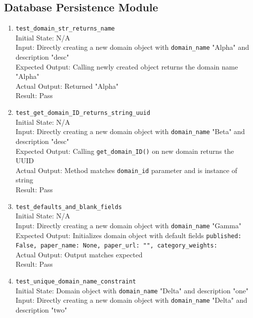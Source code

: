 \documentclass[12pt, titlepage]{article}
\begin{document}
\subsection{Database Persistence Module}
  \begin{enumerate}
    \item \texttt{test\_domain\_str\_returns\_name} \label{test-domain-str-returns-name}
      \\Initial State: N/A
      \\Input: Directly creating a new domain object with \texttt{domain\_name} "Alpha" and description "desc"
      \\Expected Output: Calling newly created object returns the domain name "Alpha"
      \\Actual Output: Returned "Alpha"
      \\Result: Pass
    \item \texttt{test\_get\_domain\_ID\_returns\_string\_uuid} \label{test-get-domain-ID-returns-string-uuid}
      \\Initial State: N/A
      \\Input: Directly creating a new domain object with \texttt{domain\_name} "Beta" and description "desc"
      \\Expected Output: Calling \texttt{get\_domain\_ID()} on new domain returns the UUID
      \\Actual Output: Method matches \texttt{domain\_id} parameter and is instance of string
      \\Result: Pass
    \item \texttt{test\_defaults\_and\_blank\_fields}\label{test-defaults-and-blank-fields}
      \\Initial State: N/A
      \\Input: Directly creating a new domain object with \texttt{domain\_name} "Gamma"
      \\Expected Output: Initializes domain object with default fields \texttt{{published: False, paper\_name: None, paper\_url: "", category\_weights: {}}}
      \\Actual Output: Output matches expected
      \\Result: Pass
    \item \texttt{test\_unique\_domain\_name\_constraint} \label{test-unique-domain-name-constraint}
      \\Initial State: Domain object with \texttt{domain\_name} "Delta" and description "one"
      \\Input: Directly creating a new domain object with \texttt{domain\_name} "Delta" and description "two"

\end{enumerate}
\end{document}
